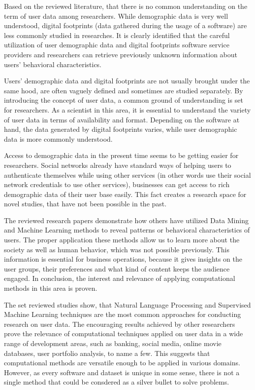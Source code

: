Based on the reviewed literature, that there is no common understanding on the term of user data among researchers. While demographic data is very well understood, digital footprints (data gathered during the usage of a software) are less commonly studied in researches. It is clearly identified that the careful utilization of user demographic data and digital footprints software service providers and researchers can retrieve previously unknown information about users' behavioral characteristics. 

Users' demographic data and digital footprints are not usually brought under the same hood, are often vaguely defined and sometimes are studied separately. By introducing the concept of user data, a common ground of understanding is set for researchers. As a scientist in this area, it is essential to understand the variety of user data in terms of availability and format. Depending on the software at hand, the data generated by digital footprints varies, while user demographic data is more commonly understood.

Access to demographic data in the present time seems to be getting easier for researchers. Social networks already have standard ways of helping users to authenticate themselves while using other services (in other words use their social network credentials to use other services), businesses can get access to rich demographic data of their user base easily. This fact creates a research space for novel studies, that have not been possible in the past. 

The reviewed research papers demonstrate how others have utilized Data Mining and Machine Learning methods to reveal patterns or behavioral characteristics of users. The proper application these methods allow us to learn more about the society as well as human behavior, which was not possible previously. This information is essential for business operations, because it gives insights on the user groups, their preferences and what kind of content keeps the audience engaged. In conclusion, the interest and relevance of applying computational methods in this area is proven.

The set reviewed studies show, that Natural Language Processing and Supervised Machine Learning techniques are the most common approaches for conducting research on user data. The encouraging results achieved by other researchers prove the relevance of computational techniques applied on user data in a wide range of development areas, such as banking, social media, online movie databases, user portfolio analysis, to name a few. This suggests that computational methods are versatile enough to be applied in various domains. However, as every software and dataset is unique in some sense, there is not a single method that could be consdered as a silver bullet to solve problems. 

